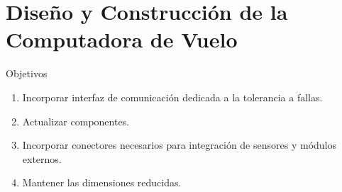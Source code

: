 \section{Diseño y Construcción de la Computadora de Vuelo}

\begin{frame}{Objetivos}
	\begin{enumerate}
		\item<2->Incorporar interfaz de comunicación dedicada a la tolerancia a fallas.
		\item<3->Actualizar componentes.
		\item<4->Incorporar conectores necesarios para integración de sensores y módulos externos.
		\item<5->Mantener las dimensiones reducidas.
	\end{enumerate}
\end{frame}

